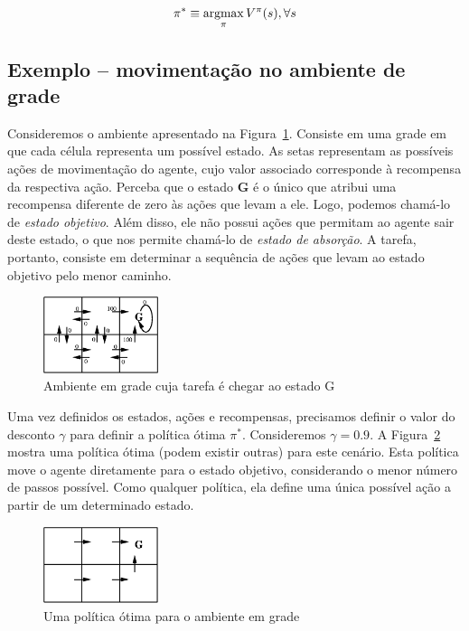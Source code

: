 $$
\pi^* \equiv \mathop{\mathrm{argmax}}_{\pi} V^\pi(s), \forall s
$$

\subsection{Exemplo -- movimentação no ambiente de grade}

Consideremos o ambiente apresentado na Figura~\ref{fig:exemplo-rl-cenario}. Consiste em uma grade em que cada célula representa um possível estado. As setas representam as possíveis ações de movimentação do agente, cujo valor associado corresponde à recompensa da respectiva ação. Perceba que o estado \textbf{G} é o único que atribui uma recompensa diferente de zero às ações que levam a ele. Logo, podemos chamá-lo de \textit{estado objetivo}. Além disso, ele não possui ações que permitam ao agente sair deste estado, o que nos permite chamá-lo de \textit{estado de absorção}. A tarefa, portanto, consiste em determinar a sequência de ações que levam ao estado objetivo pelo menor caminho.

\begin{figure}[h]
	\centering
	\includegraphics[width=0.3\textwidth]{img/exemplo-rl-cenario}
	\caption{Ambiente em grade cuja tarefa é chegar ao estado G}
	\label{fig:exemplo-rl-cenario}
\end{figure}

Uma vez definidos os estados, ações e recompensas, precisamos definir o valor do desconto $\gamma$ para definir a política ótima $\pi^*$. Consideremos $\gamma = 0.9$. A Figura~\ref{fig:exemplo-rl-politica-otima} mostra uma política ótima (podem existir outras) para este cenário. Esta política move o agente diretamente para o estado objetivo, considerando o menor número de passos possível. Como qualquer política, ela define uma única possível ação a partir de um determinado estado.

\begin{figure}[h]
	\centering
	\includegraphics[width=0.3\textwidth]{img/exemplo-rl-politica-otima}
	\caption{Uma política ótima para o ambiente em grade}
	\label{fig:exemplo-rl-politica-otima}
\end{figure}

